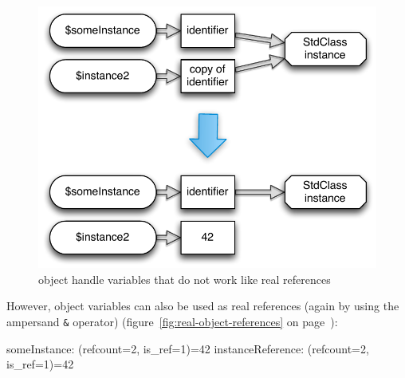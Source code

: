 
\begin{figure}[!h]
  \begin{center}
    \includegraphics[scale=0.8]{images/someInstance_instance2}
    \caption{object handle variables that do not work like real references}
    \label{fig:false-object-references}
  \end{center}
\end{figure}

However, object variables can also be used as real references (again by using the ampersand \texttt{\&} operator) (figure~\ref{fig:real-object-references} on page~\pageref{fig:real-object-references}):


\begin{textcode}
someInstance: (refcount=2, is_ref=1)=42
instanceReference: (refcount=2, is_ref=1)=42
\end{textcode}

